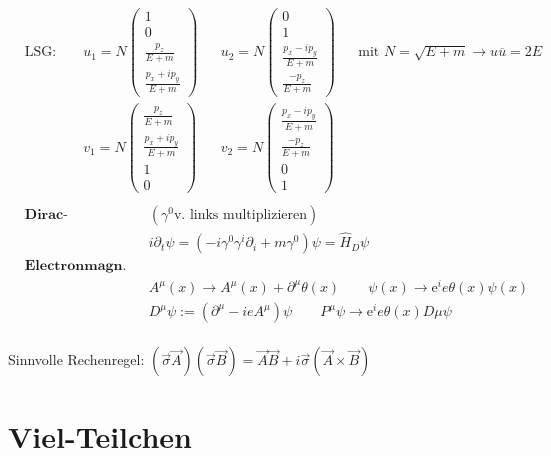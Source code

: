\documentclass[10pt,a4paper,notitlepage]{scrartcl}
\begin{document}
\begin{align*}
    &\text{LSG: } && u_1 = N \begin{pmatrix} 1 \\ 0 \\ \frac{p_z}{E+m} \\ \frac{p_x+ip_y}{E+m}\end{pmatrix}
    && u_2 = N \begin{pmatrix} 0 \\ 1 \\ \frac{p_x-ip_y}{E+m} \\ \frac{-p_z}{E+m}\end{pmatrix}
    && \text{mit } N = \sqrt{E+m} \to u\overline{u} = 2E\\
    &&& v_1 = N \begin{pmatrix} \frac{p_z}{E+m} \\ \frac{p_x+ip_y}{E+m} \\1 \\0 \end{pmatrix}
    && v_2 = N \begin{pmatrix} \frac{p_x-ip_y}{E+m} \\ \frac{-p_z}{E+m} \\ 0 \\ 1\end{pmatrix}
    &&\\
\end{align*}
\begin{align*}
    &\textbf{Dirac-Hamiltonian:} && (\gamma^0 \text{v. links multiplizieren}) &&\\
    & && i\partial_t \psi = (-i\gamma^0\gamma^i\partial_i + m \gamma^0)\psi = \hat H_D \psi\\
    & \textbf{Electronmagn. Eichinvarianz:}\\
    &&&A^\mu(x) \to A^\mu(x) + \partial^\mu\theta(x) \qquad \psi(x) \to \text{e}^ie\theta(x)\psi(x)\\
    &&&D^\mu \psi := (\partial^\mu-ieA^\mu)\psi \qquad P^\mu\psi \to \text{e}^ie\theta(x)D\mu \psi\\
\end{align*}

Sinnvolle Rechenregel: $(\vec{\sigma} \vec{A}) (\vec{\sigma} \vec{B}) = \vec{A} \vec{B} + i \vec{\sigma} (\vec{A} \times \vec{B})$

\section*{Viel-Teilchen}
\end{document}
